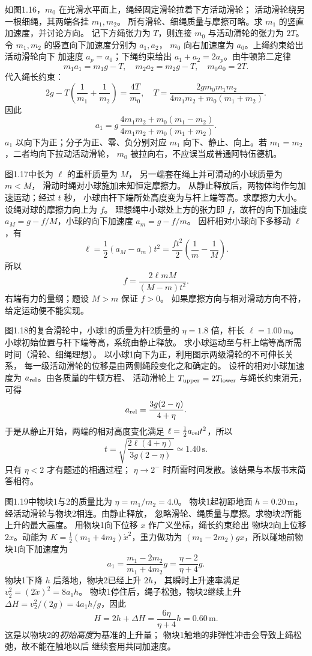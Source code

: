 如图1.16，$m_0$ 在光滑水平面上，绳经固定滑轮拉着下方活动滑轮；
活动滑轮绕另一根细绳，其两端各挂 $m_1,m_2$。
所有滑轮、细绳质量与摩擦可略。求 $m_1$ 的竖直加速度，并讨论方向。
\exsolution
记下方绳张力为 $T$，则连接 $m_0$ 与活动滑轮的张力为 $2T$。
令 $m_1,m_2$ 的竖直向下加速度分别为 $a_1,a_2$，
$m_0$ 向右加速度为 $a_0$。上绳约束给出活动滑轮向下
加速度 $a_p=a_0$；下绳约束给出 $a_1+a_2=2a_p$。由牛顿第二定律
\[
m_1a_1=m_1g-T,\quad m_2a_2=m_2g-T,\quad
m_0a_0=2T.
\]
代入绳长约束：
\[
2g-T\left(\frac1{m_1}+\frac1{m_2}\right)=\frac{4T}{m_0},
\quad
T=\frac{2gm_0m_1m_2}
 {4m_1m_2+m_0(m_1+m_2)}.
\]
因此
\[
\boxed{a_1=
g\,\frac{4m_1m_2+m_0(m_1-m_2)}
 {4m_1m_2+m_0(m_1+m_2)}}.
\]
\excheck $a_1$ 以向下为正；分子为正、零、负分别对应
$m_1$ 向下、静止、向上。若 $m_1=m_2$，二者均向下拉动活动滑轮，
$m_0$ 被拉向右，不应误当成普通阿特伍德机。

图1.17中长为 $\ell$ 的重杆质量为 $M$，
另一端套在绳上并可滑动的小球质量为 $m<M$，
滑动时绳对小球施加未知恒定摩擦力。
从静止释放后，两物体均作匀加速运动；经过 $t$ 秒，
小球由杆下端所处高度变为与杆上端等高。求摩擦力大小。
\exsolution
设绳对球的摩擦力向上为 $f$。
理想绳中小球处上方的张力即 $f$，故杆的向下加速度
$a_M=g-f/M$，小球的向下加速度 $a_m=g-f/m$。
因杆相对小球向下多移动 $\ell$，有
\[
\ell=\frac12(a_M-a_m)t^2
=\frac{ft^2}{2}\left(\frac1m-\frac1M\right).
\]
所以
\[
\boxed{f=\frac{2\ell mM}{(M-m)t^2}}.
\]
\excheck 右端有力的量纲；题设 $M>m$ 保证 $f>0$。
如果摩擦方向与相对滑动方向不符，给定运动便不能实现。

图1.18的复合滑轮中，小球1的质量为杆2质量的
$\eta=1.8$ 倍，杆长 $\ell=1.00\,\mathrm m$。
小球初始位置与杆下端等高，系统由静止释放。
求小球运动至与杆上端等高所需时间（滑轮、细绳理想）。
\exsolution
以小球1向下为正，利用图示两级滑轮的不可伸长关系，
每一级活动滑轮的位移是由两侧绳段变化之和确定的。
设杆的相对小球加速度为 $a_{\rm rel}$。由各质量的牛顿方程、
活动滑轮上 $T_{\rm upper}=2T_{\rm lower}$ 与绳长约束消元，可得
\[
a_{\rm rel}=\frac{3g(2-\eta)}{4+\eta}.
\]
于是从静止开始，两端的相对高度变化满足
$\ell=\frac12a_{\rm rel}t^2$，所以
\[
\boxed{t=\sqrt{\frac{2\ell(4+\eta)}
 {3g(2-\eta)}}\simeq1.40\,\mathrm s}.
\]
\excheck 只有 $\eta<2$ 才有题述的相遇过程；
$\eta\to2^-$ 时所需时间发散。该结果与本版书末简答相符。

图1.19中物块1与2的质量比为 $\eta=m_1/m_2=4.0$。
物块1起初距地面 $h=0.20\,\mathrm m$，
经活动滑轮与物块2相连。由静止释放，
忽略滑轮、绳质量与摩擦。求物块2所能上升的最大高度。
\exsolution
用物块1向下位移 $x$ 作广义坐标，绳长约束给出
物块2向上位移 $2x$。动能为
$K=\frac12(m_1+4m_2)\dot x^2$，重力做功为
$(m_1-2m_2)gx$，所以碰地前物块1向下加速度为
\[
a_1=\frac{m_1-2m_2}{m_1+4m_2}g
=\frac{\eta-2}{\eta+4}g .
\]
物块1下降 $h$ 后落地，物块2已经上升 $2h$，
其瞬时上升速率满足 $v_2^2=(2\dot x)^2=8a_1h$。
物块1停住后，绳子松弛，物块2继续上升
$\Delta H=v_2^2/(2g)=4a_1h/g$，因此
\[
\boxed{H=2h+\Delta H=\frac{6\eta}{\eta+4}h
=0.60\,\mathrm m}.
\]
\excheck 这是以物块2的\emph{初始高度}为基准的上升量；
物块1触地的非弹性冲击会导致上绳松弛，故不能在触地以后
继续套用共同加速度。

